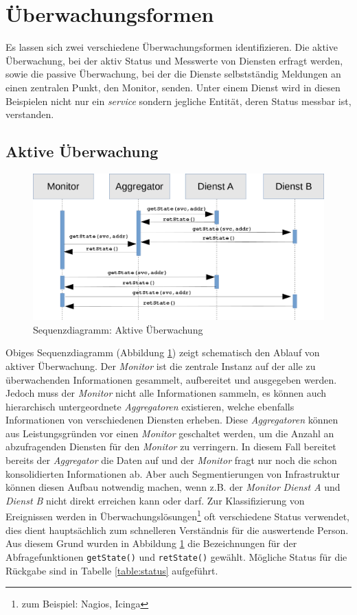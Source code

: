 \section{Überwachungsformen}

Es lassen sich zwei verschiedene Überwachungsformen identifizieren. Die aktive 
Überwachung, bei der aktiv Status und Messwerte von Diensten erfragt werden, sowie die 
passive Überwachung, bei der die Dienste selbstständig Meldungen an einen zentralen 
Punkt, den Monitor, senden. Unter einem Dienst wird in diesen Beispielen nicht nur ein 
\textit{service} sondern jegliche Entität, deren Status messbar ist, verstanden.
\newpage
\subsection{Aktive Überwachung}
\begin{figure}[htbp]
    \caption{Sequenzdiagramm: Aktive Überwachung}
    \label{aktiv}\vspace{0.2cm}
    \centering
    \includegraphics[scale=0.36]{img/sequence_uml_active_trans}

\end{figure}

Obiges Sequenzdiagramm (Abbildung \ref{aktiv}) zeigt schematisch den Ablauf von aktiver 
Überwachung. Der \emph{Monitor} ist die zentrale Instanz auf der alle zu überwachenden 
Informationen gesammelt, aufbereitet und ausgegeben werden. Jedoch muss der 
\emph{Monitor} nicht alle Informationen sammeln, es können auch hierarchisch 
untergeordnete 
\emph{Aggregatoren} existieren, welche ebenfalls Informationen von verschiedenen Diensten 
erheben. Diese \emph{Aggregatoren} können aus Leistungsgründen vor einen \emph{Monitor} 
geschaltet werden, um die Anzahl an abzufragenden Diensten für den \emph{Monitor} zu 
verringern. In diesem Fall bereitet bereits der \emph{Aggregator} die Daten auf und der 
\emph{Monitor} fragt nur noch die schon konsolidierten Informationen ab. Aber auch 
Segmentierungen von Infrastruktur können diesen Aufbau notwendig machen, wenn z.B. 
der \emph{Monitor} \emph{Dienst A} und \emph{Dienst B} nicht direkt erreichen kann oder 
darf. 
Zur Klassifizierung von Ereignissen werden in Überwachungslösungen\footnote{zum Beispiel: 
Nagios, Icinga} oft verschiedene Status verwendet, dies dient hauptsächlich zum 
schnelleren Verständnis für die auswertende Person. Aus diesem Grund wurden in 
Abbildung \ref{aktiv} die Bezeichnungen für der Abfragefunktionen \texttt{getState()} und 
\texttt{retState()} gewählt. Mögliche Status für die Rückgabe sind in Tabelle 
\ref{table:status} aufgeführt.


